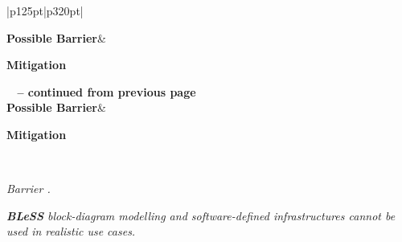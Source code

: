 \documentclass[a4paper,11pt]{article}
\newcommand{\project}[1]{\textbf{#1}\xspace}
\newcommand{\BLESS}{\project{BLeSS}}
\newcommand{\TheProject}{\BLESS}
\begin{document}
\begin{longtable}{|p{125pt}|p{320pt}|}%

\hline \textbf{Possible Barrier}&

\textbf{Mitigation}\\ \hline
\endfirsthead

%
{{\bfseries \tablename\ \thetable{} -- continued from previous
page}} \\ \hline
 \textbf{Possible Barrier}&

\textbf{Mitigation}\\ \hline
\endhead

\hline {} \\ \hline
\endfoot

\hline \hline
\endlastfoot


\addtocounter{barrier}{1}
\noindent
\emph{Barrier \thebarrier.}
\par \emph{\TheProject{} block-diagram modelling and software-defined infrastructures cannot be used in realistic use cases.}


\end{longtable}
\end{document}
